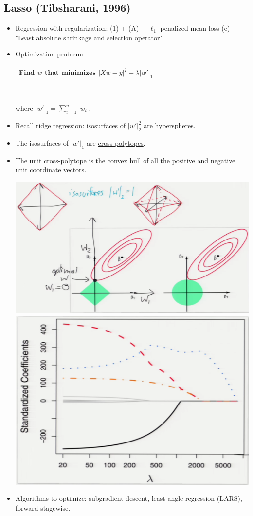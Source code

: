 \documentclass[10pt]{article}
\begin{document}
	\subsection*{Lasso (Tibsharani, 1996)}
	\begin{itemize}
		\item Regression with regularization: (1) + (A) + $\ell_{1}$ penalized mean loss (e) "Least absolute shrinkage and selection operator"
		\item Optimization problem:
		\begin{center}
			\begin{tabular}{|c|}
				\hline
				Find $w$ that minimizes $|Xw-y|^{2} + \lambda|w'|_{1}$\\
				\hline
			\end{tabular}\\
		\end{center}
		where $|w'|_{1} = \sum_{i=1}^{n}|w_{i}|$.
		\item Recall ridge regression: isosurfaces of $|w'|_{2}^{2}$ are hyperspheres. 
		\item The isosurfaces of $|w'|_{1}$ are \underline{cross-polytopes}.
		\item The unit cross-polytope is the convex hull of all the positive and negative unit coordinate vectors.
		\begin{center}
			\includegraphics[scale=0.6]{../images/lassol1}
			\includegraphics[scale=0.6]{../images/standarizesweights}
		\end{center}
		
		\item Algorithms to optimize: subgradient descent, least-angle regression (LARS), forward stagewise.
	\end{itemize}	
\end{document}
